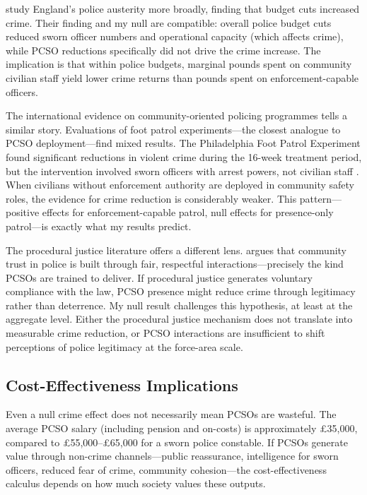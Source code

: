 \documentclass[12pt]{article}
\begin{document}
\citet{deste2024cuts} study England's police austerity more broadly, finding that budget cuts increased crime. Their finding and my null are compatible: overall police budget cuts reduced sworn officer numbers and operational capacity (which affects crime), while PCSO reductions specifically did not drive the crime increase. The implication is that within police budgets, marginal pounds spent on community civilian staff yield lower crime returns than pounds spent on enforcement-capable officers.

The international evidence on community-oriented policing programmes tells a similar story. Evaluations of foot patrol experiments---the closest analogue to PCSO deployment---find mixed results. The Philadelphia Foot Patrol Experiment found significant reductions in violent crime during the 16-week treatment period, but the intervention involved sworn officers with arrest powers, not civilian staff \citep{macdonald2016effect}. When civilians without enforcement authority are deployed in community safety roles, the evidence for crime reduction is considerably weaker. This pattern---positive effects for enforcement-capable patrol, null effects for presence-only patrol---is exactly what my results predict.

The procedural justice literature offers a different lens. \citet{bradford2014policing} argues that community trust in police is built through fair, respectful interactions---precisely the kind PCSOs are trained to deliver. If procedural justice generates voluntary compliance with the law, PCSO presence might reduce crime through legitimacy rather than deterrence. My null result challenges this hypothesis, at least at the aggregate level. Either the procedural justice mechanism does not translate into measurable crime reduction, or PCSO interactions are insufficient to shift perceptions of police legitimacy at the force-area scale.

\subsection{Cost-Effectiveness Implications}

Even a null crime effect does not necessarily mean PCSOs are wasteful. The average PCSO salary (including pension and on-costs) is approximately \pounds35,000, compared to \pounds55,000--\pounds65,000 for a sworn police constable. If PCSOs generate value through non-crime channels---public reassurance, intelligence for sworn officers, reduced fear of crime, community cohesion---the cost-effectiveness calculus depends on how much society values these outputs.
\end{document}
